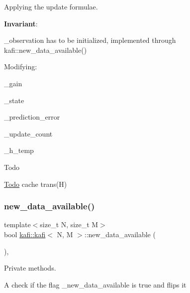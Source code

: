 Applying the update formulae. 

{\bfseries Invariant}\+:
\begin{DoxyItemize}
\item {\ttfamily \+\_\+observation} has to be initialized, implemented through kafi\+::new\+\_\+data\+\_\+available()
\end{DoxyItemize}

Modifying\+:
\begin{DoxyItemize}
\item {\ttfamily \+\_\+gain}
\item {\ttfamily \+\_\+state}
\item {\ttfamily \+\_\+prediction\+\_\+error}
\item {\ttfamily \+\_\+update\+\_\+count}
\item {\ttfamily \+\_\+h\+\_\+temp}
\end{DoxyItemize}

\begin{DoxyRefDesc}{Todo}
\item[\hyperlink{todo__todo000005}{Todo}]cache {\ttfamily trans(\+H)} \end{DoxyRefDesc}
\mbox{\label{classkafi_1_1kafi_a29ff5938b1fd205fe3861370d6455227}} 
\subsubsection{\texorpdfstring{new\+\_\+data\+\_\+available()}{new\_data\_available()}}
{\footnotesize\ttfamily template$<$size\+\_\+t N, size\+\_\+t M$>$ \\
bool \hyperlink{classkafi_1_1kafi}{kafi\+::kafi}$<$ N, M $>$\+::new\+\_\+data\+\_\+available (\begin{DoxyParamCaption}{ }\end{DoxyParamCaption})\hspace{0.3cm}{\ttfamily [inline]}, {\ttfamily [private]}}



Private methods. 

A check if the flag {\ttfamily \+\_\+new\+\_\+data\+\_\+available} is true and flips it \mbox{\label{classkafi_1_1kafi_ac9627c8086987fb34edc5ef85abee316}} 
